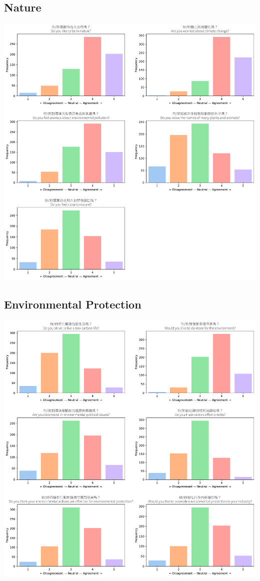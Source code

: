 \documentclass[
  letterpaper,
  DIV=11,
  numbers=noendperiod]{scrartcl}
\begin{document}
\subsection{Nature}\label{nature}

\includegraphics{_thesis_files/figure-pdf/cell-68-output-1.pdf}

\subsection{Environmental Protection}\label{environmental-protection}

\includegraphics{_thesis_files/figure-pdf/cell-69-output-1.pdf}
\end{document}
